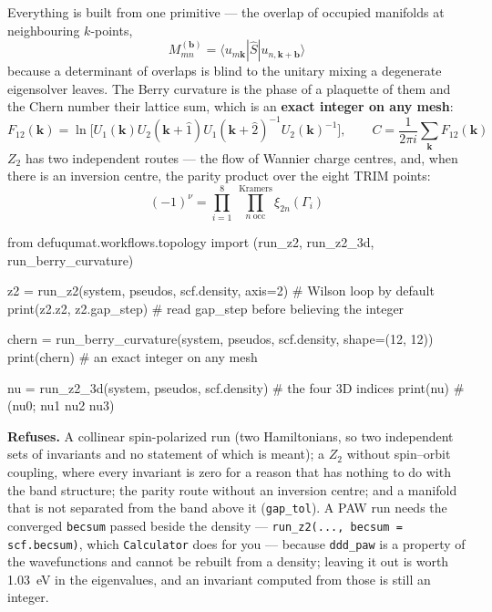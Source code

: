 \documentclass[11pt,a4paper]{article}
\newcommand{\code}[1]{\texttt{\small #1}}
\begin{document}
Everything is built from one primitive --- the overlap of occupied manifolds at
neighbouring $k$-points,
\begin{equation*}
M^{(\mathbf b)}_{mn} = \langle u_{m\mathbf k}|\hat S|u_{n,\mathbf k+\mathbf b}\rangle
\end{equation*}
because a determinant of overlaps is blind to the unitary mixing a degenerate
eigensolver leaves. The Berry curvature is the phase of a plaquette of them and
the Chern number their lattice sum, which is an \textbf{exact integer on any
mesh}:
\begin{equation*}
F_{12}(\mathbf k) = \ln\big[U_1(\mathbf k)U_2(\mathbf k{+}\hat 1)
  U_1(\mathbf k{+}\hat 2)^{-1}U_2(\mathbf k)^{-1}\big],
\qquad C = \frac{1}{2\pi i}\sum_{\mathbf k} F_{12}(\mathbf k)
\end{equation*}
$Z_2$ has two independent routes --- the flow of Wannier charge centres, and,
when there is an inversion centre, the parity product over the eight TRIM
points:
\begin{equation*}
(-1)^{\nu} = \prod_{i=1}^{8}\ \prod_{n\ \mathrm{occ}}^{\mathrm{Kramers}}
  \xi_{2n}(\Gamma_i)
\end{equation*}

\begin{pycode}
from defuqumat.workflows.topology import (run_z2, run_z2_3d,
                                         run_berry_curvature)

z2 = run_z2(system, pseudos, scf.density, axis=2)   # Wilson loop by default
print(z2.z2, z2.gap_step)   # read gap_step before believing the integer

chern = run_berry_curvature(system, pseudos, scf.density, shape=(12, 12))
print(chern)                # an exact integer on any mesh

nu = run_z2_3d(system, pseudos, scf.density)   # the four 3D indices
print(nu)                   # (nu0; nu1 nu2 nu3)
\end{pycode}

\begin{refuses}
\textbf{Refuses.} A collinear spin-polarized run (two Hamiltonians, so two
independent sets of invariants and no statement of which is meant); a $Z_2$
without spin--orbit coupling, where every invariant is zero for a reason that
has nothing to do with the band structure; the parity route without an
inversion centre; and a manifold that is not separated from the band above it
(\code{gap\_tol}). A PAW run needs the converged \code{becsum} passed beside
the density --- \code{run\_z2(..., becsum = scf.becsum)}, which
\code{Calculator} does for you --- because \code{ddd\_paw} is a property of the
wavefunctions and cannot be rebuilt from a density; leaving it out is worth
1.03~eV in the eigenvalues, and an invariant computed from those is still an
integer.
\end{refuses}
\end{document}
